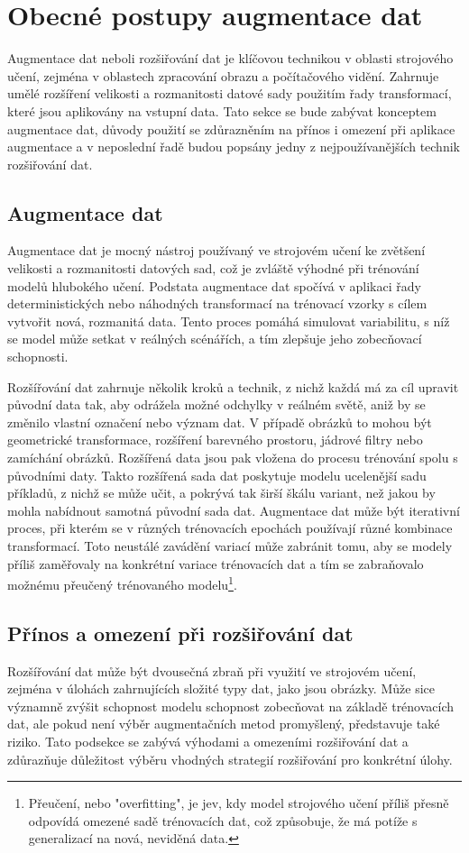 \documentclass[male,czech,api_ing]{thesis}
\begin{document}
\section{Obecné postupy augmentace dat}
Augmentace dat neboli rozšiřování dat je klíčovou technikou v oblasti strojového učení, zejména v oblastech zpracování obrazu a počítačového vidění. Zahrnuje umělé rozšíření velikosti a rozmanitosti datové sady použitím řady transformací, které jsou aplikovány na vstupní data. Tato sekce se bude zabývat konceptem augmentace dat, důvody použití se zdůrazněním na přínos i omezení při aplikace augmentace a v neposlední řadě budou popsány jedny z nejpoužívanějších technik rozšiřování dat.

\subsection{Augmentace dat}
Augmentace dat je mocný nástroj používaný ve strojovém učení ke zvětšení velikosti a rozmanitosti datových sad, což je zvláště výhodné při trénování modelů hlubokého učení. Podstata augmentace dat spočívá v aplikaci řady deterministických nebo náhodných transformací na trénovací vzorky s cílem vytvořit nová, rozmanitá data. Tento proces pomáhá simulovat variabilitu, s níž se model může setkat v reálných scénářích, a tím zlepšuje jeho zobecňovací schopnosti.

Rozšířování dat zahrnuje několik kroků a technik, z nichž každá má za cíl upravit původní data tak, aby odrážela možné odchylky v reálném světě, aniž by se změnilo vlastní označení nebo význam dat. V případě obrázků to mohou být geometrické transformace, rozšíření barevného prostoru, jádrové filtry nebo zamíchání obrázků. Rozšířená data jsou pak vložena do procesu trénování spolu s původními daty. Takto rozšířená sada dat poskytuje modelu ucelenější sadu příkladů, z nichž se může učit, a pokrývá tak širší škálu variant, než jakou by mohla nabídnout samotná původní sada dat. Augmentace dat může být iterativní proces, při kterém se v různých trénovacích epochách používají různé kombinace transformací. Toto neustálé zavádění variací může zabránit tomu, aby se modely příliš zaměřovaly na konkrétní variace trénovacích dat a tím se zabraňovalo možnému přeučený trénovaného modelu\footnote{Přeučení, nebo "overfitting", je jev, kdy model strojového učení příliš přesně odpovídá omezené sadě trénovacích dat, což způsobuje, že má potíže s generalizací na nová, neviděná data.}. \cite{AugmentationBasics, AugmentationSurvey}

\subsection{Přínos a omezení při rozšiřování dat}
Rozšířování dat může být dvousečná zbraň při využití ve strojovém učení, zejména v úlohách zahrnujících složité typy dat, jako jsou obrázky. Může sice významně zvýšit schopnost modelu schopnost zobecňovat na základě trénovacích dat, ale pokud není výběr augmentačních metod promyšlený, představuje také riziko. Tato podsekce se zabývá výhodami a omezeními rozšiřování dat a zdůrazňuje důležitost výběru vhodných strategií rozšiřování pro konkrétní úlohy.
\end{document}
